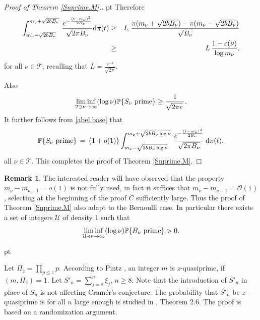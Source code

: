 \documentclass[11pt,draft,reqno]{amsart}
\theoremstyle{definition}
\theoremstyle{remarks}
\newtheorem{remark}[theorem]{{\bf  Remark}}
\numberwithin{equation}{section}
\def \e{{\varepsilon}}
\def \dd{{\rm d}}
\def\P{{\mathcal P}}
\def\P{{\mathbb P}}
\begin{document}
\begin{proof}[Proof of Theorem \ref{Snprime.M}.]
 pt Therefore 
  \begin{eqnarray}\label{base} 
  \int_{m_\nu-\sqrt{ 2bB_\nu }}^{m_\nu+\sqrt{ 2bB_\nu }}
  \,\frac{ e^{- \frac{(t- m_\nu)^2}{    2  B_\nu   } } }{ \sqrt{2\pi  B_\nu  } } \dd \pi(t)&\ge & L \  \frac{ \pi(m_\nu+\sqrt{ 2bB_\nu })-\pi(m_\nu-\sqrt{ 2bB_\nu })}{ \sqrt{   B_\nu  }}\cr & \ge &  L\, \frac{1-\e(\nu)}{\log m_{\nu}},
\end{eqnarray}
for all $\nu \in\mathcal T$, recalling that $L=\frac{e^{-b }}{  \sqrt{2\pi }}$.

Also  \begin{equation}\label{abel.base,proof}  
\liminf_{  \mathcal T\ni \nu\to\infty} (\log \nu)\P \{S_\nu\ \hbox{prime}  \}
\ge  \frac{1  }{ \sqrt{2\pi e}\, } .
 \end{equation}
  It further follows from \eqref{abel.base} that  
\begin{equation}\label{abel.base,,proof}  
 \P \{S_\nu\ \hbox{prime}  \}
\, =\, \big(1+ o( 1)\big)
\int_{m_\nu-\sqrt{ 2bB_\nu\log \nu}}^{m_\nu+\sqrt{ 2bB_\nu\log \nu}}
  \,\frac{ e^{- \frac{(t- m_\nu)^2}{    2  B_\nu   } } }{ \sqrt{2\pi  B_\nu  } }\, \dd \pi(t),
  \end{equation}
   all $\nu\in \mathcal T$. This completes the proof of Theorem \ref{Snprime.M}.
   \end{proof}
\begin{remark}\label{rem.Snprime.M}\rm 
The interested reader will have  observed that the property $m_\nu-m_{\nu-1}= o(1)$ is not fully used, in fact it suffices that  $m_\nu-m_{\nu-1}= \mathcal O(1)$, selecting at the beginning of the proof $C$ sufficiently large.  Thus the proof of Theorem \ref{Snprime.M} also adapt to the Bernoulli case. In particular there exists a set of integers $\mathcal U$ of density 1 such that
\begin{equation}\label{bernoulli.d1}  
\liminf_{  \mathcal U\ni \nu\to\infty} (\log \nu)\P \{B_\nu\ \hbox{prime}  \}
>0 .
 \end{equation}
\end{remark}
  pt 

 
 

  Let $\Pi_z=\prod_{p\le z}p$. According to Pintz \cite{Pi}, an integer $m$ is   $z$-quasiprime, if $(m, \Pi_z)=1$. Let $S'_n= \sum_{j= 8}^n \xi_j$, $n\ge 8$. Note that the introduction of $S'_n$ in place of $S_n$ is not affecting Cram\'er's conjecture. The probability that $S'_n$   be $z$-quasiprime is   for all $n$ large enough is studied in \cite{W8}, Theorem 2.6.
   The proof is based on a randomization argument.
     
\end{document}
